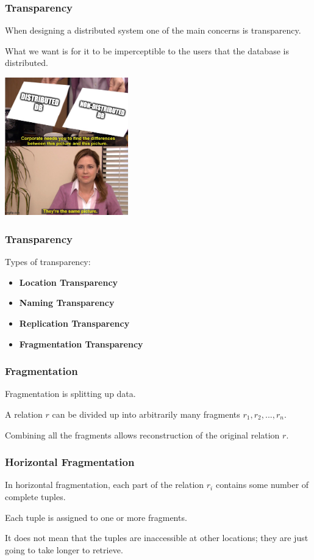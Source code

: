 \begin{frame}
\frametitle{Transparency}

When designing a distributed system one of the main concerns is \alert{transparency}. 

What we want is for it to be imperceptible to the users that the database is distributed.

\begin{center}
	\includegraphics[width=0.4\textwidth]{images/samepicture.jpg}
\end{center}

\end{frame}


\begin{frame}
\frametitle{Transparency}

Types of transparency: 
\begin{itemize}
	\item \textbf{Location Transparency}
	\item \textbf{Naming Transparency}
	\item \textbf{Replication Transparency}
	\item \textbf{Fragmentation Transparency}
\end{itemize}



\end{frame}

\begin{frame}
\frametitle{Fragmentation}

Fragmentation is splitting up data. 

A relation $r$ can be divided up into arbitrarily many fragments $r_{1}, r_{2}, ..., r_{n}$.

Combining all the fragments allows reconstruction of the original relation $r$. 


\end{frame}


\begin{frame}
\frametitle{Horizontal Fragmentation}

In \alert{horizontal fragmentation}, each part of the relation $r_{i}$ contains some number of complete tuples. 

Each tuple is assigned to one or more fragments.

It does not mean that the tuples are inaccessible at other locations; they are just going to take longer to retrieve.

\end{frame}

